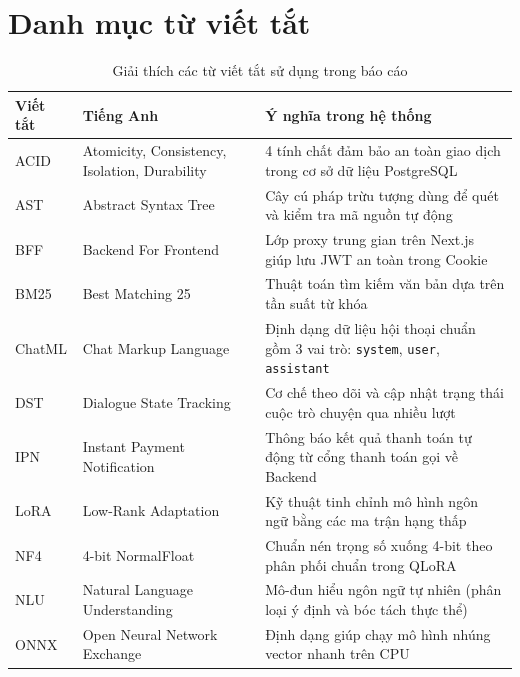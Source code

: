 \chapter*{Danh mục từ viết tắt}
{}
\vspace{-0.3cm}

\begin{table}[!ht]
\centering
\caption{Giải thích các từ viết tắt sử dụng trong báo cáo}
\label{tab:abbreviations}
\footnotesize
\renewcommand{\arraystretch}{1.08}
\begin{tabularx}{\textwidth}{|L{2.0cm}|L{4.4cm}|X|}
\hline
{}
\textbf{Viết tắt} & \textbf{Tiếng Anh} & \textbf{Ý nghĩa trong hệ thống} \\
\hline
ACID & Atomicity, Consistency, Isolation, Durability & 4 tính chất đảm bảo an toàn giao dịch trong cơ sở dữ liệu PostgreSQL \\
\hline
AST & Abstract Syntax Tree & Cây cú pháp trừu tượng dùng để quét và kiểm tra mã nguồn tự động \\
\hline
BFF & Backend For Frontend & Lớp proxy trung gian trên Next.js giúp lưu JWT an toàn trong Cookie \\
\hline
BM25 & Best Matching 25 & Thuật toán tìm kiếm văn bản dựa trên tần suất từ khóa \\
\hline
ChatML & Chat Markup Language & Định dạng dữ liệu hội thoại chuẩn gồm 3 vai trò: \texttt{system}, \texttt{user}, \texttt{assistant} \\
\hline
DST & Dialogue State Tracking & Cơ chế theo dõi và cập nhật trạng thái cuộc trò chuyện qua nhiều lượt \\
\hline
IPN & Instant Payment Notification & Thông báo kết quả thanh toán tự động từ cổng thanh toán gọi về Backend \\
\hline
LoRA & Low-Rank Adaptation & Kỹ thuật tinh chỉnh mô hình ngôn ngữ bằng các ma trận hạng thấp \\
\hline
NF4 & 4-bit NormalFloat & Chuẩn nén trọng số xuống 4-bit theo phân phối chuẩn trong QLoRA \\
\hline
NLU & Natural Language Understanding & Mô-đun hiểu ngôn ngữ tự nhiên (phân loại ý định và bóc tách thực thể) \\
\hline
ONNX & Open Neural Network Exchange & Định dạng giúp chạy mô hình nhúng vector nhanh trên CPU \\

\end{tabularx}
\end{table}
